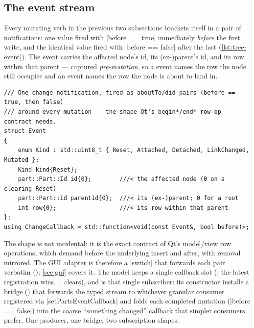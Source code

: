 \subsection{The event stream}\label{sec:tree-events}

Every mutating verb in the previous two subsections brackets itself in a pair of notifications:
one  value fired with \cppinline|before == true| immediately \emph{before} the first
write, and the identical value fired with \cppinline|before == false| after the last
(\cref{lst:tree-event}). The event carries the affected node's id, its (ex-)parent's id, and its
row within that parent --- captured \emph{pre-mutation}, so a  event names the row
the node still occupies and an  event names the row the node is about to land in.

\begin{listing}[htbp]
\begin{verbatim}
/// One change notification, fired as aboutTo/did pairs (before == true, then false)
/// around every mutation -- the shape Qt's begin*/end* row-op contract needs.
struct Event
{
    enum Kind : std::uint8_t { Reset, Attached, Detached, LinkChanged, Mutated };
    Kind kind{Reset};
    part::Part::Id id{0};        ///< the affected node (0 on a clearing Reset)
    part::Part::Id parentId{0};  ///< its (ex-)parent; 0 for a root
    int row{0};                  ///< its row within that parent
};
using ChangeCallback = std::function<void(const Event&, bool before)>;
\end{verbatim}
\caption{The change notification (--151).}
\label{lst:tree-event}
\end{listing}

The shape is not incidental: it is the exact contract of Qt's model/view row operations, which
demand  before the underlying insert and
 after, with removal mirrored. The GUI adapter is therefore a
\cppinline|switch| that forwards each pair verbatim ();
\cref{sec:gui} covers it. The model keeps a single callback slot
(; the latest registration wins, \cppinline|{}| clears), and
 is that single subscriber: its constructor installs a bridge
() that forwards the typed stream to whichever granular
consumer registered via \cppinline|setPartsEventCallback| and folds each completed mutation
(\cppinline|before == false|) into the coarse ``something changed'' callback that simpler
consumers prefer. One producer, one bridge, two subscription shapes.

